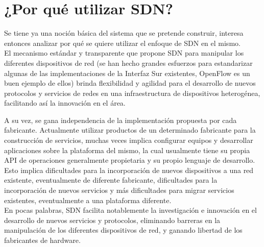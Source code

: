 \section[¿Por qu\'e utilizar SDN?]{¿Por qu\'e utilizar SDN?}

Se tiene ya una noción básica del sistema que se pretende construir, interesa entonces analizar por qu\'e se quiere utilizar el enfoque de SDN en el mismo.\\

El mecanismo estándar y transparente que propone SDN para manipular los diferentes dispositivos de red  
 (se han hecho grandes esfuerzos para estandarizar algunas de las implementaciones de la Interfaz Sur existentes, OpenFlow es un buen ejemplo de ellos) brinda flexibilidad y agilidad para el desarrollo de nuevos protocolos y servicios de redes en una infraestructura de dispositivos heterogénea, facilitando as\'i la innovaci\'on en el \'area. 

A su vez, se gana independencia de la implementaci\'on propuesta por cada fabricante. Actualmente utilizar productos de un determinado fabricante para la construcci\'on de servicios, muchas veces implica configurar equipos y desarrollar aplicaciones sobre la plataforma del mismo, la cual usualmente tiene su propia API de operaciones generalmente propietaria y su propio lenguaje de desarrollo. Esto implica dificultades para la incorporaci\'on de nuevos dispositivos a una red existente, eventualmente de diferente fabricante, dificultades para la incorporaci\'on de nuevos servicios y m\'as dificultades para migrar servicios existentes, eventualmente a una plataforma diferente.\\

En pocas palabras, SDN facilita notablemente la investigaci\'on e innovaci\'on en el desarrollo de nuevos servicios y protocolos, eliminando barreras en la manipulaci\'on de los diferentes dispositivos de red, y ganando libertad de los fabricantes de hardware.\\




